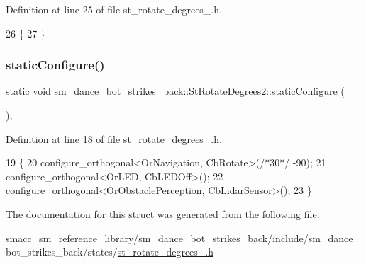 Definition at line 25 of file st\+\_\+rotate\+\_\+degrees\+\_.\+h.


\begin{DoxyCode}
26   \{ 
27   \}
\end{DoxyCode}
\mbox{\label{structsm__dance__bot__strikes__back_1_1StRotateDegrees2_af1e939b6d83665b725ecba04323333d6}} 
\subsubsection{\texorpdfstring{static\+Configure()}{staticConfigure()}}
{\footnotesize\ttfamily static void sm\+\_\+dance\+\_\+bot\+\_\+strikes\+\_\+back\+::\+St\+Rotate\+Degrees2\+::static\+Configure (\begin{DoxyParamCaption}{ }\end{DoxyParamCaption})\hspace{0.3cm}{\ttfamily [inline]}, {\ttfamily [static]}}



Definition at line 18 of file st\+\_\+rotate\+\_\+degrees\+\_.\+h.


\begin{DoxyCode}
19   \{
20     configure\_orthogonal<OrNavigation, CbRotate>(\textcolor{comment}{/*30*/} -90);
21     configure\_orthogonal<OrLED, CbLEDOff>();
22     configure\_orthogonal<OrObstaclePerception, CbLidarSensor>();
23   \}
\end{DoxyCode}


The documentation for this struct was generated from the following file\+:\begin{DoxyCompactItemize}
\item 
smacc\+\_\+sm\+\_\+reference\+\_\+library/sm\+\_\+dance\+\_\+bot\+\_\+strikes\+\_\+back/include/sm\+\_\+dance\+\_\+bot\+\_\+strikes\+\_\+back/states/\hyperlink{strikes__back_2include_2sm__dance__bot__strikes__back_2states_2st__rotate__degrees__2_8h}{st\+\_\+rotate\+\_\+degrees\+\_.\+h}\end{DoxyCompactItemize}
